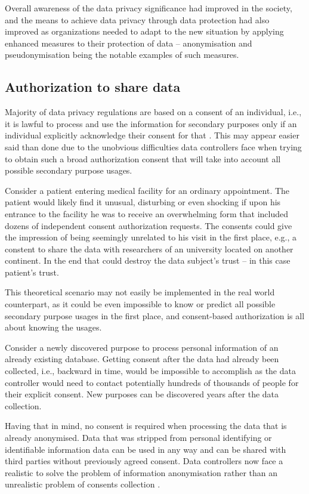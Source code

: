 \documentclass[a4paper,twoside,12pt]{book}
\begin{document}
Overall awareness of the data privacy significance had improved in the society, and the means to achieve data privacy through data protection had also improved as organizations needed to adapt to the new situation by applying enhanced measures to their protection of data – anonymisation and pseudonymisation being the notable examples of such measures. 

\subsection{Authorization to share data}

Majority of data privacy regulations are based on a consent of an individual, i.e., it is lawful to process and use the information for secondary purposes only if an individual explicitly acknowledge their consent for that \cite{bib:gdpr_practical_guide}. This may appear easier said than done due to the unobvious difficulties data controllers face when trying to obtain such a broad authorization consent that will take into account all possible secondary purpose usages.

Consider a patient entering medical facility for an ordinary appointment. The patient would likely find it unusual, disturbing or even shocking if upon his entrance to the facility he was to receive an overwhelming form that included dozens of independent consent authorization requests. The consents could give the impression of being seemingly unrelated to his visit in the first place, e.g., a constent to share the data with researchers of an university located on another continent. In the end that could destroy the data subject's trust – in this case patient's trust.

This theoretical scenario may not easily be implemented in the real world counterpart, as it could be even impossible to know or predict all possible secondary purpose usages in the first place, and consent-based authorization is all about knowing the usages.

Consider a newly discovered purpose to process personal information of an already existing database. Getting consent after the data had already been collected, i.e., backward in time, would be impossible to accomplish as the data controller would need to contact potentially hundreds of thousands of people for their explicit consent. New purposes can be discovered years after the data collection.

Having that in mind, no consent is required when processing the data that is already anonymised. Data that was stripped from personal identifying or identifiable information data can be used in any way and can be shared with third parties without previously agreed consent. Data controllers now face a realistic to solve the problem of information anonymisation rather than an unrealistic problem of consents collection \cite{bib:anonymizing_health_data}.
\end{document}
